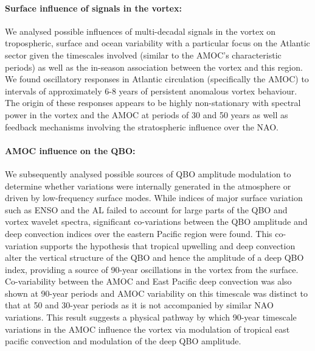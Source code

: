\paragraph{Surface influence of signals in the vortex:}
We analysed possible influences of multi-decadal signals in the vortex on tropospheric, surface and ocean variability with a particular focus on the Atlantic sector given the timescales involved (similar to the AMOC's characteristic periods) as well as the in-season association between the vortex and this region. We found oscillatory responses in Atlantic circulation (specifically the AMOC) to intervals of approximately 6-8 years of persistent anomalous vortex behaviour. The origin of these responses appears to be highly non-stationary with spectral power in the vortex and the AMOC at periods of 30 and 50 years as well as feedback mechanisms involving the stratospheric influence over the NAO.

\paragraph{AMOC influence on the QBO:}
We subsequently analysed possible sources of QBO amplitude modulation to determine whether variations were internally generated in the atmosphere or driven by low-frequency surface modes. While indices of major surface variation such as ENSO and the AL failed to account for large parts of the QBO and vortex wavelet spectra, significant co-variations between the QBO amplitude and deep convection indices over the eastern Pacific region were found. This co-variation supports the hypothesis that tropical upwelling and deep convection alter the vertical structure of the QBO and hence the amplitude of a deep QBO index, providing a source of 90-year oscillations in the vortex from the surface. Co-variability between the AMOC and East Pacific deep convection was also shown at 90-year periods and AMOC variability on this timescale was distinct to that at 50 and 30-year periods as it is not accompanied by similar NAO variations. This result suggests a physical pathway by which 90-year timescale variations in the AMOC influence the vortex via modulation of tropical east pacific convection and modulation of the deep QBO amplitude. 

